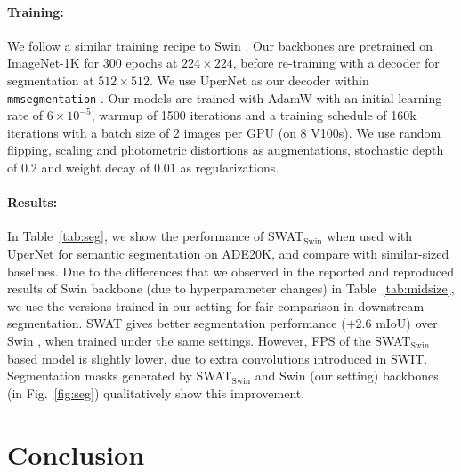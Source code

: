 \documentclass[10pt,twocolumn,letterpaper]{article}
\newcommand{\fref}[1]{Fig.~\ref{#1}}
\newcommand{\tref}[1]{Table~\ref{#1}}
\begin{document}
\paragraph{Training:} We follow a similar training recipe to Swin \cite{liu2021swin}. Our backbones are pretrained on ImageNet-1K \cite{deng2009imagenet} for 300 epochs at $224\times224$, before re-training with a decoder for segmentation at $512\times512$. We use UperNet \cite{xiao2018unified} as our decoder within \texttt{mmsegmentation} \cite{mmseg2020}. Our models are trained with AdamW \cite{kingma15adam} with an initial learning rate of $6\times10^{-5}$, warmup of 1500 iterations and a training schedule of 160k iterations with a batch size of 2 images per GPU (on 8 V100s). We use random flipping, scaling and photometric distortions as augmentations, stochastic depth \cite{huang2016deep} of 0.2 and weight decay \cite{loshchilov2017decoupled} of 0.01 as regularizations.

\paragraph{Results:} In \tref{tab:seg}, we show the performance of SWAT$_\text{Swin}$ when used with UperNet \cite{xiao2018unified} for semantic segmentation on ADE20K, and compare with similar-sized baselines. Due to the differences that we observed in the reported and reproduced results of Swin backbone (due to hyperparameter changes) in \tref{tab:midsize}, we use the versions trained in our setting for fair comparison in downstream segmentation. SWAT gives better segmentation performance ($+2.6$ mIoU) over Swin \cite{liu2021swin}, when trained under the same settings. However, FPS of the SWAT$_\text{Swin}$ based model is slightly lower, due to extra convolutions introduced in SWIT. %
Segmentation masks generated by SWAT$_\text{Swin}$ and Swin \cite{liu2021swin} (our setting) backbones (in \fref{fig:seg}) qualitatively show this improvement. \vspace{-1mm}



\section{Conclusion}
\label{sec:conclusion}
\end{document}
